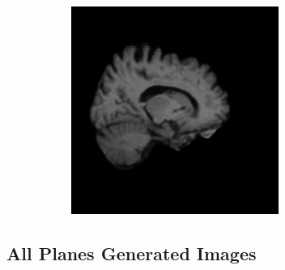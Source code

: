 \documentclass[12pt, fleqn, titlepage]{article}
\newcommand\skipperer{0.45pt}
\begin{document}
\begin{figure}[H]
\begin{subfigure}[b]{0.7\textwidth}
		\hskip\skipperer
		\includegraphics[width=0.15\linewidth]{imgs/3T_no_noise}
	\end{subfigure}
\end{figure}

\subsection{All Planes Generated Images}\label{all_generated}
\end{document}
